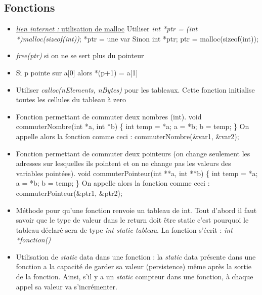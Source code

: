 \documentclass[12pt,a4paper]{article}
\begin{document}
\subsection{Fonctions}
\begin{itemize}
\item \href{https://www.codingunit.com/c-tutorial-the-functions-malloc-and-free}{\textit{lien internet : }utilisation de malloc}
\newline Utiliser \textit{int *ptr = (int *)malloc(sizeof(int))}; *ptr = une var
\newline Sinon int *ptr; ptr = malloc(sizeof(int));
\item \textit{free(ptr)} si on ne se sert plus du pointeur
\item Si p pointe sur a[0] alors *(p+1) = a[1]
\item Utiliser \textit{calloc(nElements, nBytes)} pour les tableaux. Cette fonction initialise toutes les cellules du tableau à zero
\item Fonction permettant de commuter deux nombres (int).
\newline void commuterNombre(int *a, int *b) \{
\newline int temp = *a;
\newline *a = *b;
\newline *b = temp; \}
\newline On appelle alors la fonction comme ceci : commuterNombre(\&var1, \&var2);
\item Fonction permettant de commuter deux pointeurs (on change seulement les adresses sur lesquelles ils pointent et on ne change pas les valeurs des variables pointées).
\newline void commuterPointeur(int **a, int **b) \{
\newline int temp = *a;
\newline *a = *b;
\newline *b = temp; \}
\newline On appelle alors la fonction comme ceci : commuterPointeur(\&ptr1, \&ptr2);
\item Méthode pour qu'une fonction renvoie un tableau de int. Tout d'abord il faut savoir que le type de valeur dans le return doit être static c'est pourquoi le tableau déclaré sera de type \textit{int static tableau}. La fonction s'écrit : \textit{int *fonction()}
\item Utilisation de \textit{static} data dans une fonction : la \textit{static} data présente dans une fonction a la capacité de garder sa valeur (persistence) même après la sortie de la fonction. Ainsi, s’il y a un \textit{static} compteur dans une fonction, à chaque appel sa valeur va s’incrémenter.

\end{itemize}
\end{document}
